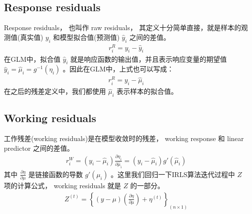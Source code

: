 \documentclass[letterpaper,10pt,english]{sphinxmanual}
\begin{document}
\subsection{Response residuals}
\label{\detokenize{_u6a21_u578b_u8bc4_u4f30/content:response-residuals}}
Response residuals， 也叫作 raw residuals， 其定义十分简单直接，就是样本的观测值(真实值)
\(y_i\) 和模型拟合值(预测值) \(\hat{y}_i\) 之间的差值。
\begin{equation}\label{equation:模型评估/content:模型评估/content:26}
\begin{split}r_i^R = y_i -\hat{y}_i\end{split}
\end{equation}
在GLM中，拟合值 \(\hat{y}_i\) 就是响应函数的输出值，并且表示响应变量的期望值
\(\hat{y}_i=\hat{\mu}_i=g^{-1}(\eta_i)\)
。因此在GLM中，上式也可以写成：
\begin{equation}\label{equation:模型评估/content:模型评估/content:27}
\begin{split}r_i^R = y_i -\hat{\mu}_i\end{split}
\end{equation}
在之后的残差定义中，我们都使用 \(\hat{\mu}_i\) 表示样本的拟合值。


\subsection{Working residuals}
\label{\detokenize{_u6a21_u578b_u8bc4_u4f30/content:working-residuals}}
工作残差(working residuals)是在模型收敛时的残差，
working response 和 linear predictor 之间的差值。
\begin{equation}\label{equation:模型评估/content:模型评估/content:28}
\begin{split}r^W_i = (y_i -\hat{\mu}_i) \frac{\partial \eta_i}{\partial \hat{\mu}_i} = (y_i -\hat{\mu}_i) g'(\hat{\mu}_i)\end{split}
\end{equation}
其中 \(\frac{\partial \eta}{\partial \mu}\) 是链接函数的导数 \(g'(\mu_i)\)
。这里我们回归一下IRLS算法迭代过程中 \(Z\) 项的计算公式，
working residuals 就是 \(Z\) 的一部分。
\begin{equation}\label{equation:模型评估/content:模型评估/content:29}
\begin{split}   Z^{(t)} = \left \{ (y-\mu)  \left ( \frac{\partial \eta}{\partial \mu} \right) + \eta^{(t)}
\right \}_{(n\times 1 )}\end{split}
\end{equation}
\end{document}
